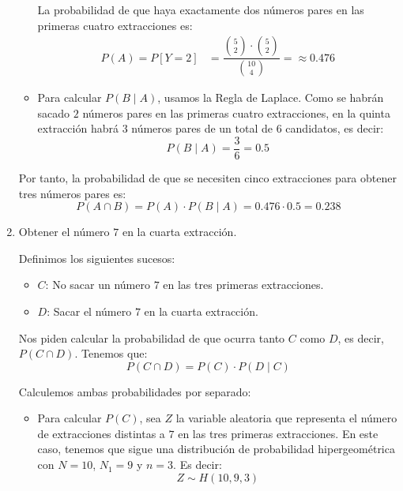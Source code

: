\begin{ejercicio}
\begin{enumerate}
\begin{itemize}
            La probabilidad de que haya exactamente dos números pares en las primeras cuatro extracciones es:
            \begin{align*}
                P(A) = P[Y=2] &= \dfrac{\binom{5}{2} \cdot \binom{5}{2}}{\binom{10}{4}} = \approx 0.476
            \end{align*}

            \item Para calcular $P(B\mid A)$, usamos la Regla de Laplace.
            Como se habrán sacado $2$ números pares en las primeras cuatro extracciones, en la quinta extracción habrá $3$ números pares de un total de $6$ candidatos, es decir:
            \begin{equation*}
                P(B\mid A) = \dfrac{3}{6} = 0.5
            \end{equation*}
        \end{itemize}

        Por tanto, la probabilidad de que se necesiten cinco extracciones para obtener tres números pares es:
        \begin{equation*}
            P(A\cap B) = P(A)\cdot P(B\mid A) = 0.476 \cdot 0.5 = 0.238
        \end{equation*}
        
        \item Obtener el número $7$ en la cuarta extracción.
        
        Definimos los siguientes sucesos:
        \begin{itemize}
            \item $C$: No sacar un número $7$ en las tres primeras extracciones.
            \item $D$: Sacar el número $7$ en la cuarta extracción.
        \end{itemize}

        Nos piden calcular la probabilidad de que ocurra tanto $C$ como $D$, es decir, $P(C\cap D)$. Tenemos que:
        \begin{equation*}
            P(C\cap D) = P(C)\cdot P(D\mid C)
        \end{equation*}

        Calculemos ambas probabilidades por separado:
        \begin{itemize}
            \item Para calcular $P(C)$, sea $Z$ la variable aleatoria que representa el número de extracciones distintas a $7$ en las tres primeras extracciones. En este caso, tenemos que sigue una distribución de probabilidad hipergeométrica con $N=10$, $N_1=9$ y $n=3$. Es decir:
            \begin{equation*}
                Z \sim H(10,9,3)
            \end{equation*}


\end{itemize}
\end{enumerate}
\end{ejercicio}
